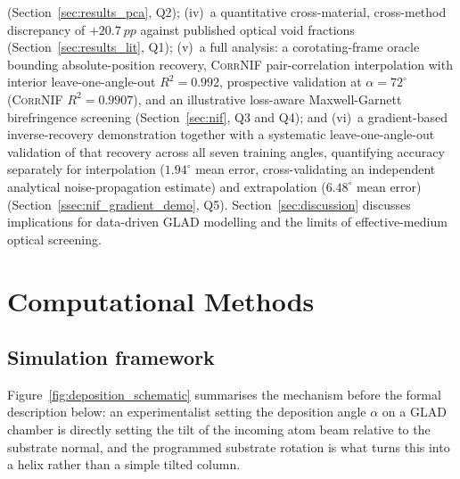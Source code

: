 \documentclass[aip,amsmath,amssymb,reprint]{revtex4-1}
\newcommand{\dang}{\ensuremath{\alpha}}
\begin{document}
(Section~\ref{sec:results_pca}, Q2);
(iv)~a quantitative cross-material, cross-method discrepancy of
$+\SI{20.7}{pp}$ against published optical void fractions
(Section~\ref{sec:results_lit}, Q1);
(v)~a full analysis: a corotating-frame oracle bounding absolute-position
recovery, \textsc{CorrNIF}
  pair-correlation interpolation with interior leave-one-angle-out
  $R^2 = 0.992$, prospective validation at $\dang = 72^{\circ}$
  (\textsc{CorrNIF} $R^2 = 0.9907$), and an
illustrative loss-aware Maxwell-Garnett birefringence screening
(Section~\ref{sec:nif}, Q3 and Q4); and
(vi)~a gradient-based inverse-recovery demonstration together with a
systematic leave-one-angle-out validation of that recovery across all
seven training angles, quantifying accuracy separately for interpolation
($1.94^{\circ}$ mean error, cross-validating an independent analytical
noise-propagation estimate) and extrapolation ($6.48^{\circ}$ mean error)
(Section~\ref{ssec:nif_gradient_demo}, Q5).
Section~\ref{sec:discussion} discusses implications for data-driven GLAD
modelling and the limits of effective-medium optical screening.

\section{Computational Methods}
\label{sec:methods}

\subsection{Simulation framework}
\label{ssec:sim}

Figure~\ref{fig:deposition_schematic} summarises the mechanism before the
formal description below: an experimentalist setting the deposition angle
$\dang$ on a GLAD chamber is directly setting the tilt of the incoming
atom beam relative to the substrate normal, and the programmed substrate
rotation is what turns this into a helix rather than a simple tilted
column.
\end{document}
